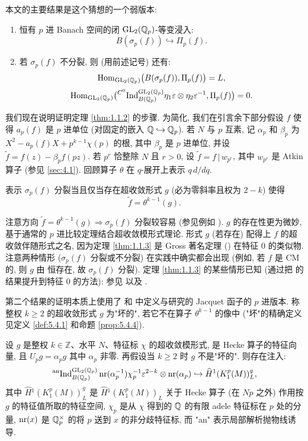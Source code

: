 本文的主要结果是这个猜想的一个弱版本:

\begin{theorem}\label{thm:1.1.2}
\begin{enumerate}
\item[(i)] 恒有 $p$ 进 Banach 空间的闭 $\mathrm{GL}_2(\mathbb{Q}_p)$-等变浸入:
\[
B(\sigma_p(f)) \hookrightarrow \Pi_p(f).
\]
\item[(ii)] 若 $\sigma_p(f)$ 不分裂, 则 (用前述记号) 还有:
\[
\operatorname{Hom}_{\mathrm{GL}_2(\mathbb{Q}_p)}\bigl(B(\sigma_p(f)),\Pi_p(f)\bigr) = L,
\]
\[
\operatorname{Hom}_{\mathrm{GL}_2(\mathbb{Q}_p)}\bigl(\prescript{C^{0}}{}{\mathrm{Ind}}_{B(\mathbb{Q}_p)}^{\mathrm{GL}_2(\mathbb{Q}_p)} \eta_1 \varepsilon \otimes \eta_2 \varepsilon^{-1},\Pi_p(f)\bigr) = 0.
\]
\end{enumerate}
\end{theorem}

我们现在说明证明定理 \ref{thm:1.1.2} 的步骤.
为简化, 我们在引言余下部分假设 $f$ 使得 $a_p(f)$ 是 $p$ 进单位 (对固定的嵌入 $\mathbb{Q} \hookrightarrow \mathbb{Q}_p$).
若 $N$ 与 $p$ 互素, 记 $\alpha_p$ 和 $\beta_p$ 为 $X^2 - a_p(f)X + p^{k-1}\chi(p)$ 的根, 其中 $\beta_p$ 是 $p$ 进单位, 并设 $\tilde{f} = f(z) - \beta_p f(pz)$.
若 $p^r$ 恰整除 $N$ 且 $r > 0$, 设 $\tilde{f} = f\,|\,w_{p^r}$, 其中 $w_{p^r}$ 是 Atkin 算子 (参见 \ref{sec:4.1}).
回顾算子 $\theta$ 在 $q$-展开上表示 $q\,d/dq$.

\begin{theorem}\label{thm:1.1.3}
表示 $\sigma_p(f)$ 分裂当且仅当存在超收敛形式 $g$ (必为零斜率且权为 $2-k$) 使得
\[
\tilde{f} = \theta^{k-1}(g).
\]
\end{theorem}

注意方向 $\tilde{f} = \theta^{k-1}(g) \Rightarrow \sigma_p(f)$ 分裂较容易 (参见例如 \cite[Prop.~11]{ref:30}).
$g$ 的存在性更为微妙, 基于通常的 $p$ 进比较定理结合超收敛模形式理论.
形式 $g$ (若存在) 配得上 $f$ 的超收敛伴随形式之名, 因为定理 \ref{thm:1.1.3} 是 Gross 著名定理 (\cite{ref:33}) 在特征 $0$ 的类似物.
注意两种情形 ($\sigma_p(f)$ 分裂或不分裂) 在实践中确实都会出现 (例如, 若 $f$ 是 CM 的, 则 $g$ 由 \cite[Prop.~7.1]{ref:13} 恒存在, 故 $\sigma_p(f)$ 分裂).
定理 \ref{thm:1.1.3} 的某些情形已知 (通过把 \cite{ref:33} 的结果提升到特征 $0$ 的方法): 参见 \cite{ref:11} 以及 \cite[\S6]{ref:30}.

第二个结果的证明本质上使用了 \cite{ref:22} 和 \cite{ref:25} 中定义与研究的 Jacquet 函子的 $p$ 进版本.
称整权 $k \ge 2$ 的超收敛形式 $g$ 为"坏的", 若它不在算子 $\theta^{k-1}$ 的像中 ("坏"的精确定义见定义 \ref{def:5.4.1} 和命题 \ref{prop:5.4.4}).

\begin{theorem}\label{thm:1.1.4}
设 $g$ 是整权 $k \in \mathbb{Z}$、水平 $N$、特征标 $\chi$ 的超收敛模形式, 是 Hecke 算子的特征向量, 且 $U_p g = \alpha_p g$ 其中 $\alpha_p$ 非零.
再假设当 $k \ge 2$ 时 $g$ 不是"坏的".
则存在注入:
\[
\prescript{\mathrm{an}}{}{\mathrm{Ind}}_{B(\mathbb{Q}_p)}^{\mathrm{GL}_2(\mathbb{Q}_p)} \operatorname{nr}(\alpha_p^{-1})\chi_p^{-1}\varepsilon^{2-k} \otimes \operatorname{nr}(\alpha_p) \hookrightarrow \widehat{H}{}^{1}(K_1^{p}(M))_L^{g},
\]
其中 $\widehat{H}{}^{1}(K_1^{p}(M))_L^{g}$ 是 $\widehat{H}{}^{1}(K_1^{p}(M))_L$ 关于 Hecke 算子 (在 $Np$ 之外) 作用按 $g$ 的特征值所取的特征空间, $\chi_p$ 是从 $\chi$ 得到的 $\mathbb{Q}$ 的有限 adele 特征标在 $p$ 处的分量, $\operatorname{nr}(x)$ 是 $\mathbb{Q}_p^{\times}$ 的将 $p$ 送到 $x$ 的非分歧特征标, 而 "an" 表示局部解析抛物线诱导.
\end{theorem}

